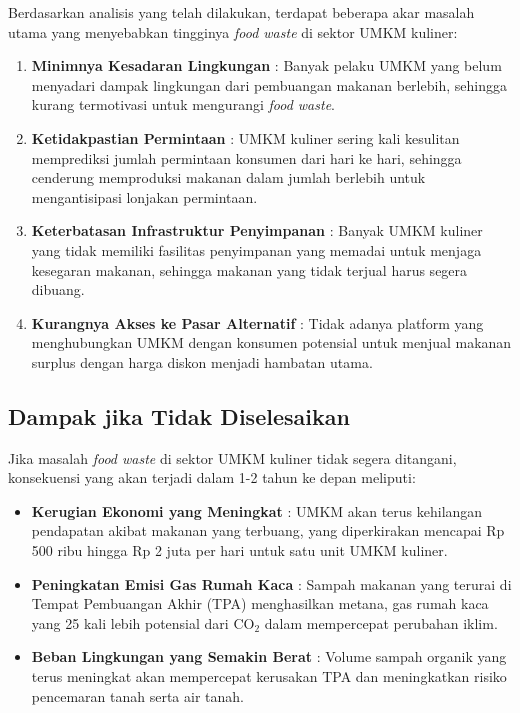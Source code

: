Berdasarkan analisis yang telah dilakukan, terdapat beberapa akar masalah utama yang menyebabkan tingginya \textit{food waste} di sektor UMKM kuliner:

\begin{enumerate}[leftmargin=*]
    \item \textbf{Minimnya Kesadaran Lingkungan} : Banyak pelaku UMKM yang belum menyadari dampak lingkungan dari pembuangan makanan berlebih, sehingga kurang termotivasi untuk mengurangi \textit{food waste}.
    
    \item \textbf{Ketidakpastian Permintaan} : UMKM kuliner sering kali kesulitan memprediksi jumlah permintaan konsumen dari hari ke hari, sehingga cenderung memproduksi makanan dalam jumlah berlebih untuk mengantisipasi lonjakan permintaan.
    
    \item \textbf{Keterbatasan Infrastruktur Penyimpanan} : Banyak UMKM kuliner yang tidak memiliki fasilitas penyimpanan yang memadai untuk menjaga kesegaran makanan, sehingga makanan yang tidak terjual harus segera dibuang.
    
    \item \textbf{Kurangnya Akses ke Pasar Alternatif} : Tidak adanya platform yang menghubungkan UMKM dengan konsumen potensial untuk menjual makanan surplus dengan harga diskon menjadi hambatan utama.
\end{enumerate}

\subsection{Dampak jika Tidak Diselesaikan}

Jika masalah \textit{food waste} di sektor UMKM kuliner tidak segera ditangani, konsekuensi yang akan terjadi dalam 1-2 tahun ke depan meliputi:

\begin{itemize}[leftmargin=*]
    \item \textbf{Kerugian Ekonomi yang Meningkat} : UMKM akan terus kehilangan pendapatan akibat makanan yang terbuang, yang diperkirakan mencapai Rp 500 ribu hingga Rp 2 juta per hari untuk satu unit UMKM kuliner.
    
    \item \textbf{Peningkatan Emisi Gas Rumah Kaca} : Sampah makanan yang terurai di Tempat Pembuangan Akhir (TPA) menghasilkan metana, gas rumah kaca yang 25 kali lebih potensial dari CO$_2$ dalam mempercepat perubahan iklim.
    
    \item \textbf{Beban Lingkungan yang Semakin Berat} : Volume sampah organik yang terus meningkat akan mempercepat kerusakan TPA dan meningkatkan risiko pencemaran tanah serta air tanah.
\end{itemize}

